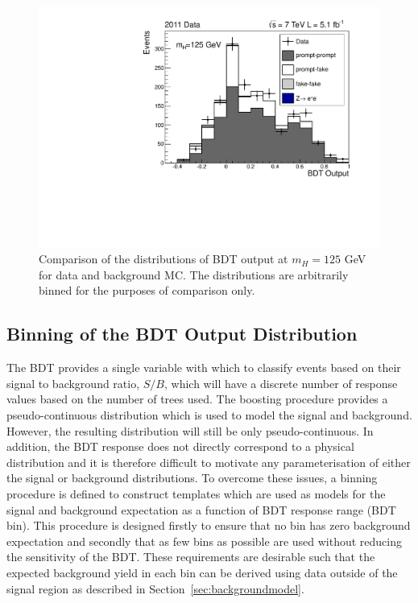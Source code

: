 \begin{figure}
 \begin{center}
  \includegraphics[width=.8\textwidth]{hgg7TeV/sidebandMvaPlots/data-mc-sbsum-mh125}
 \end{center}
 \caption{Comparison of the distributions of BDT output at $m_{H}=125$ GeV for data and background MC. 
 The distributions are arbitrarily binned for the purposes of comparison only.}
 \label{fig:datamcagreement_sidebandBDT}
\end{figure}

\subsection{Binning of the BDT Output Distribution}
\label{sec:binningofthebdtoutputdistribution}

The BDT provides a single variable with which to classify events based on their signal to background 
ratio, $S/B$, which will have a discrete number of response values based on the number of
trees used. The boosting procedure provides a pseudo-continuous distribution which is used
to model the signal and background. However, the resulting distribution will still be only
pseudo-continuous. In addition, the BDT response does not directly correspond to a physical
distribution and it is therefore difficult to motivate any parameterisation of either the signal
or background distributions. To overcome these issues, a binning procedure is defined to 
construct templates which are used as models for the signal and background expectation as a
function of BDT response range (BDT bin). This procedure is designed firstly to ensure that no
bin has zero background expectation and secondly that as few bins as possible
are used without reducing the sensitivity of the BDT. 
These requirements are desirable such that 
the expected background yield in each bin can be derived using data outside of the signal region
as described in Section~\ref{sec:backgroundmodel}.

